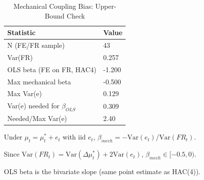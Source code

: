 \begin{table}[!htbp]
\centering
\small
\caption{Mechanical Coupling Bias: Upper-Bound Check}
\label{tab:coupling_bias}
\begin{threeparttable}
\begin{tabular}{@{}ll@{}}
\toprule
Statistic & Value \\
\midrule
N (FE/FR sample) & 43 \\
Var(FR) & 0.257 \\
OLS beta (FE on FR, HAC4) & -1.200 \\
Max mechanical beta & -0.500 \\
Max Var(e) & 0.129 \\
Var(e) needed for $\beta_{OLS}$ & 0.309 \\
Needed/Max Var(e) & 2.40 \\
\bottomrule
\end{tabular}
\begin{tablenotes}[flushleft]
\footnotesize
\item Under $\mu_t=\mu^*_t+e_t$ with iid $e_t$, $\beta_{mech}=-\mathrm{Var}(e_t)/\mathrm{Var}(FR_t)$.
\item Since $\mathrm{Var}(FR_t)=\mathrm{Var}(\Delta \mu^*_t)+2\mathrm{Var}(e_t)$, $\beta_{mech}\in[-0.5,0)$.
\item OLS beta is the bivariate slope (same point estimate as HAC(4)).
\end{tablenotes}
\end{threeparttable}
\end{table}
